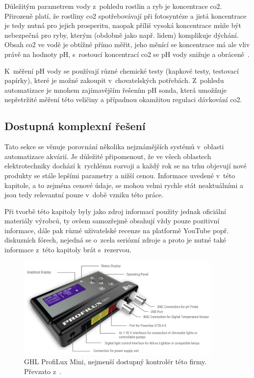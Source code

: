             Důležitým parametrem vody z~pohledu rostlin a ryb je koncentrace \acs{co2}. Přirozeně platí, že rostliny \acs{co2} spotřebovávají při fotosyntéze a jistá koncentrace je tedy nutná pro jejich prosperitu, naopak příliš vysoká koncentrace může být nebezpečná pro ryby, kterým (obdobně jako např. lidem) komplikuje dýchání. Obsah \acs{co2} ve vodě je obtížné přímo měřit, jeho měnící se koncentrace má ale vliv právě na hodnoty pH, s~rostoucí koncentrací \acs{co2} se pH vody snižuje a obráceně~\cite{DvorakJan2014RPpa,KejzlarRadim2022Ařpa}. 

            K~měření pH vody se používají různé chemické testy (kapkové testy, testovací papírky), které je možné zakoupit v~chovatelských potřebách. Z~pohledu automatizace je mnohem zajímavějším řešením pH sonda, která umožňuje nepřetržité měření této veličiny a případnou okamžitou regulaci dávkování \acs{co2}.

             
    \subsection{Dostupná komplexní řešení}
    \label{lab:kapitola-komplexni-reseni}
        Tato sekce se věnuje porovnání několika nejznámějších systémů v~oblasti automatizace akvárií. Je důležité připomenout, že ve všech oblastech elektrotechniky dochází k~rychlému rozvoji a každý rok se na trhu objevují nové produkty se stále lepšími parametry a nižší cenou. Informace uvedené v~této kapitole, a to zejména cenové údaje, se mohou velmi rychle stát neaktuálními a jsou tedy relevantní pouze v~době vzniku této práce.

        Při tvorbě této kapitoly byly jako zdroj informací použity jednak oficiální materiály výrobců, ty ovšem samozřejmě obsahují vždy pouze pozitivní informace, dále pak různé uživatelské recenze na platformě YouTube popř. diskuzních fórech, nejedná se o~zcela seriózní zdroje a proto je nutné také informace z~této kapitoly brát s~rezervou. 

        \begin{figure}[h!]
            \centering
            \includegraphics[width=0.9\textwidth]{obrazky/trh/GHL-ProfiLux-Mini.jpg}
            \caption{GHL ProfiLux Mini, nejmenší dostupný kontrolér této firmy. Převzato z~\cite{ghl-profilux}.}
            \label{fig:obrazky-trh-GHL-ProfiLux-Mini-jpg}
        \end{figure}
